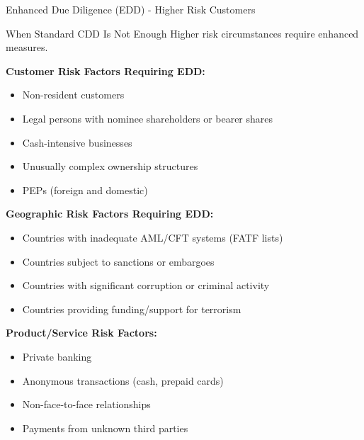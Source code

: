 \documentclass[11pt,a4paper]{beamer}
\begin{document}
	\begin{frame}{Enhanced Due Diligence (EDD) - Higher Risk Customers}
		\begin{block}{When Standard CDD Is Not Enough}
			Higher risk circumstances require enhanced measures.
		\end{block}
		\textbf{Customer Risk Factors Requiring EDD:}
		\begin{itemize}
			\item Non-resident customers
			\item Legal persons with nominee shareholders or bearer shares
			\item Cash-intensive businesses
			\item Unusually complex ownership structures
			\item PEPs (foreign and domestic)
		\end{itemize}
		\textbf{Geographic Risk Factors Requiring EDD:}
		\begin{itemize}
			\item Countries with inadequate AML/CFT systems (FATF lists)
			\item Countries subject to sanctions or embargoes
			\item Countries with significant corruption or criminal activity
			\item Countries providing funding/support for terrorism
		\end{itemize}
		\textbf{Product/Service Risk Factors:}
		\begin{itemize}
			\item Private banking
			\item Anonymous transactions (cash, prepaid cards)
			\item Non-face-to-face relationships
			\item Payments from unknown third parties
		\end{itemize}
	\end{frame}
	
\end{document}
